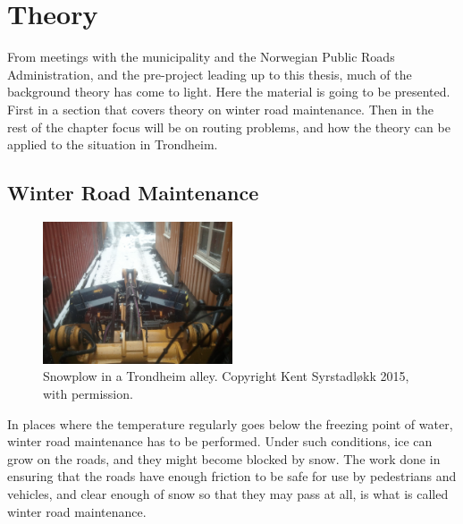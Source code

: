 \chapter{Theory}
\label{theory}

From meetings with the municipality and the Norwegian Public Roads Administration, and the pre-project leading up to this thesis, much of the background theory has come to light. Here the material is going to be presented. First in a section that covers theory on winter road maintenance. Then in the rest of the chapter focus will be on routing problems, and how the theory can be applied to the situation in Trondheim.

\section{Winter Road Maintenance} %
\label{sec:snow_plowing}


\begin{figure}
    \begin{center}
        \includegraphics[width=0.5\textwidth]{figures/MachineryIllustrations/snowplow-Kent_Syrstadlokk-2012-04-18.jpg}
    \end{center}
    \caption{Snowplow in a Trondheim alley. Copyright Kent Syrstadløkk 2015, with permission.}
    \label{fig:snowplow_in_alley}
\end{figure}

In places where the temperature regularly goes below the freezing point of water, winter road maintenance has to be performed. Under such conditions, ice can grow on the roads, and they might become blocked by snow. The work done in ensuring that the roads have enough friction to be safe for use by pedestrians and vehicles, and clear enough of snow so that they may pass at all, is what is called winter road maintenance.

